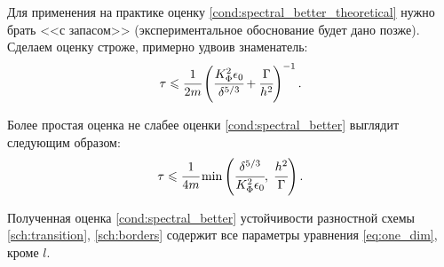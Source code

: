 Для применения на практике оценку \eqref{cond:spectral_better_theoretical} нужно брать <<с запасом>> (экспериментальное обоснование будет дано позже). Сделаем оценку строже, примерно удвоив знаменатель:
\begin{equation}
    \tau \leqslant \cfrac{1}{2m} \left( \cfrac{K_\Phi^2 \epsilon_0}{\delta^{5 / 3}} + \cfrac{\Gamma}{h^2} \right)^{-1} {\text{.}}
    \label{cond:spectral_better}
\end{equation}

Более простая оценка не слабее оценки \eqref{cond:spectral_better} выглядит следующим образом:
\begin{equation}
    \tau \leqslant \cfrac{1}{4m} \min \left(\cfrac{\delta^{5 / 3}}{K_\Phi^2 \epsilon_0}, \; \cfrac{h^2}{\Gamma} \right) {\text{.}}
    \label{cond:spectral_better_simpler}
\end{equation}

Полученная оценка \eqref{cond:spectral_better} устойчивости разностной схемы \eqref{sch:transition}, \eqref{sch:borders} содержит все параметры уравнения \eqref{eq:one_dim}, кроме $l$.